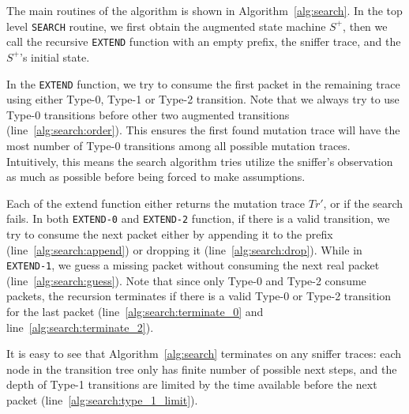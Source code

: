 The main routines of the algorithm is shown in Algorithm~\ref{alg:search}.
In the top level \texttt{SEARCH} routine, we first obtain the augmented state
machine $S^+$, then we call the recursive \texttt{EXTEND} function with an empty
prefix, the sniffer trace, and the $S^+$'s initial state.

In the \texttt{EXTEND} function, we try to consume the first packet in the
remaining trace using either Type-0, Type-1 or Type-2 transition.
Note that we always try to use Type-0 transitions before other two augmented
transitions (line~\ref{alg:search:order}).
This ensures the first found mutation trace will have the most number of Type-0
transitions among all possible mutation traces.
Intuitively, this means the search algorithm tries utilize the sniffer's
observation as much as possible before being forced to make assumptions.


Each of the extend function either returns the mutation trace $Tr'$, or
\textit{\nil} if the search fails.
In both \texttt{EXTEND-0} and
\texttt{EXTEND-2} function, if there is a valid transition, we try to consume
the next packet either by appending it to the prefix
(line~\ref{alg:search:append}) or dropping it (line~\ref{alg:search:drop}).
While in \texttt{EXTEND-1}, we guess a missing packet without consuming the next
real packet (line~\ref{alg:search:guess}).
Note that since only Type-0 and Type-2 consume packets, the recursion terminates
if there is a valid Type-0 or Type-2 transition for the last packet
(line~\ref{alg:search:terminate_0} and line~\ref{alg:search:terminate_2}).



It is easy to see that Algorithm~\ref{alg:search} terminates on any sniffer
traces: each node in the transition tree only has finite number of possible next
steps, and the depth of Type-1 transitions are limited by the time available
before the next packet (line~\ref{alg:search:type_1_limit}).
